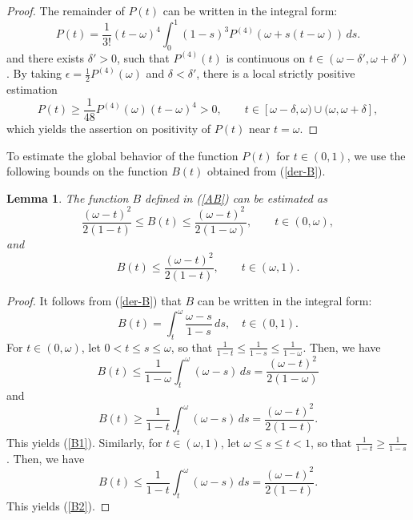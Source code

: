 \documentclass[12pt,reqno]{amsart}
\numberwithin{equation}{section}
\numberwithin{figure}{section}
\newtheorem{lemma}[theorem]{Lemma}
\begin{document}
\begin{proof}
The remainder of $P(t)$ can be written in the integral form:
\begin{equation*}
P (t)=    \frac{1}{3!} (t-\omega)^4 \int_0^1 (1-s)^3P^{(4)}(\omega+s(t-\omega))\,ds. 
\end{equation*}
and there exists $\delta' >0$, such that $P^{(4)}(t)$ is continuous on $t\in (\omega-\delta',\omega + \delta')$. By taking $\epsilon = \frac{1}{2}P^{(4)}(\omega)$ and $\delta<\delta'$, there is a local strictly positive estimation 
\begin{equation*}
P (t) \geq  \frac{1}{48}P^{(4)}(\omega) (t-\omega)^4 >0, \quad \quad t\in [\omega-\delta,\omega ) \cup ( \omega, \omega + \delta], 
\end{equation*}
which yields the assertion on positivity of $P(t)$ near $t = \omega$. 
\end{proof}

To estimate the global behavior of the function $P(t)$ for $t \in (0,1)$, 
we use the following bounds on the function $B(t)$ obtained from (\ref{der-B}).

\begin{lemma}
	\label{lemma2}
	The function $B$ defined in (\ref{AB}) can be estimated as 
	\begin{equation}\label{B1}
	\frac{(\omega - t)^2}{2(1-t)} \leq B(t) \leq \frac{(\omega - t)^2}{2(1-\omega)}, \quad \quad  t\in (0,\omega), 
	\end{equation}
	and
	\begin{equation}\label{B2}
	B(t) \leq \frac{(\omega - t)^2}{2(1-t)}, \quad \quad t\in (\omega, 1). 
	\end{equation} 
\end{lemma}
	
	\begin{proof}
It follows from (\ref{der-B}) that $B$ can be written in the integral form:
		\begin{equation*}
		B(t) = \int_t^\omega \frac{\omega-s}{1-s}\,ds, \quad t \in (0,1).
		\end{equation*}
		For $t\in (0,\omega)$, let $0<t\leq s \leq \omega$, so that $ \frac{1}{1-t} \leq \frac{1}{1-s} \leq \frac{1}{1-\omega}$. Then, we have
		\begin{equation*}
		B(t) \leq \frac{1}{1-\omega} \int_t^\omega (\omega - s)\,ds = \frac{(\omega - t)^2}{2(1-\omega)}
		\end{equation*}
		and 
		\begin{equation*}
		B(t) \geq \frac{1}{1-t} \int_t^\omega (\omega - s)\,ds = \frac{(\omega-t)^2}{2(1-t)}.
		\end{equation*}
		This yields (\ref{B1}). Similarly, for $t\in (\omega,1)$, let $\omega \leq s \leq t < 1$, so that $\frac{1}{1-t} \geq \frac{1}{1-s}$. Then, we have
		\begin{equation*}
		B(t) \leq \frac{1}{1-t} \int_t^\omega (\omega - s)\,ds = \frac{(\omega-t)^2}{2(1-t)}.
		\end{equation*}
This yields (\ref{B2}).
	\end{proof}
\end{document}
